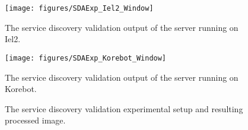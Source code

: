     \begin{figure}%
      \begin{center}
      \texttt{[image: figures/SDAExp\_Iel2\_Window]}
      \end{center}
      \caption{The service discovery validation output of the server running on Iel2.}
      \label{fig:validation3-results-iel2}
    \end{figure}

    \begin{figure}%
      \begin{center}
      \texttt{[image: figures/SDAExp\_Korebot\_Window]}
      \end{center}
      \caption{The service discovery validation output of the server running on Korebot.}
      \label{fig:validation3-results-korebot}
    \end{figure}

    \begin{figure}%
      \begin{center}
      \end{center}
    \caption{The service discovery validation experimental setup and 
             resulting processed image.}
    \label{fig:validation3-results-b}
    \end{figure}


